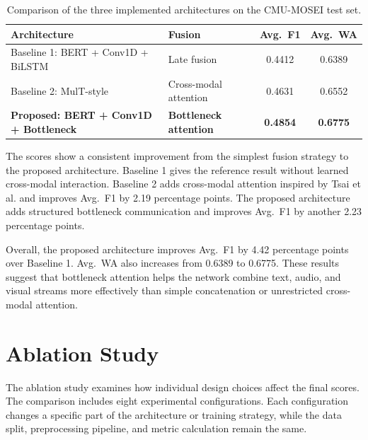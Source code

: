 \begin{table}[H]
\centering
\small
\caption{Comparison of the three implemented architectures on the CMU-MOSEI test set.}
\label{tab:arch_comparison}
\begin{tabular}{p{5.1cm}p{3.2cm}cc}
\hline
\textbf{Architecture} & \textbf{Fusion} & \textbf{Avg.~F1} & \textbf{Avg.~WA} \\
\hline
Baseline 1: BERT + Conv1D + BiLSTM    
& Late fusion           
& 0.4412 & 0.6389 \\

Baseline 2: MulT-style         
& Cross-modal attention 
& 0.4631 & 0.6552 \\

\textbf{Proposed: BERT + Conv1D + Bottleneck} 
& \textbf{Bottleneck attention} 
& \textbf{0.4854} & \textbf{0.6775} \\
\hline
\end{tabular}
\end{table}



The scores show a consistent improvement from the simplest fusion strategy to the proposed architecture. Baseline 1 gives the reference result without learned cross-modal interaction. Baseline 2 adds cross-modal attention inspired by Tsai et al. \cite{tsai2019multimodal} and improves Avg.~F1 by 2.19 percentage points. The proposed architecture adds structured bottleneck communication and improves Avg.~F1 by another 2.23 percentage points.

Overall, the proposed architecture improves Avg.~F1 by 4.42 percentage points over Baseline 1. Avg.~WA also increases from 0.6389 to 0.6775. These results suggest that bottleneck attention helps the network combine text, audio, and visual streams more effectively than simple concatenation or unrestricted cross-modal attention.

\section{Ablation Study}
\label{sec:ablation}

The ablation study examines how individual design choices affect the final scores. The comparison includes eight experimental configurations. Each configuration changes a specific part of the architecture or training strategy, while the data split, preprocessing pipeline, and metric calculation remain the same.

